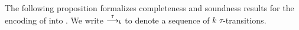 
The following proposition formalizes completeness and soundness results for the encoding of 
\HOp into \HO.
We write $\stackrel{\tau}{\longrightarrow}_k$ to denote a sequence of $k$ $\tau$-transitions.


